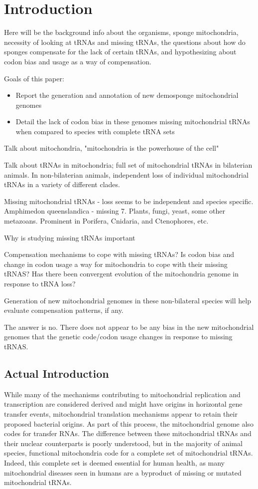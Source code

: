 \documentclass[../main.tex]{subfiles}
\begin{document}
\section{Introduction}
Here will be the background info about the organisms, sponge
mitochondria, necessity of looking at tRNAs and missing tRNAs, the questions about how do sponges compensate for the lack of certain tRNAs, and hypothesizing about codon bias and usage as a way of compensation.

Goals of this paper:
\begin{itemize}
    \item Report the generation and annotation of new demosponge mitochondrial genomes
    \item Detail the lack of codon bias in these genomes missing mitochondrial tRNAs when compared to species with complete tRNA sets
\end{itemize}

Talk about mitochondria, "mitochondria is the powerhouse of the cell"

Talk about tRNAs in mitochondria; full set of mitochondrial tRNAs in bilaterian animals. In non-bilaterian animals, independent loss of individual mitochondrial tRNAs in a variety of different clades.

Missing mitochondrial tRNAs - loss seems to be independent and species specific. Amphimedon queenslandica - missing 7. Plants, fungi, yeast, some other metazoans. Prominent in Porifera, Cnidaria, and Ctenophores, etc.

Why is studying missing tRNAs important

Compensation mechanisms to cope with missing tRNAs? Is codon bias and change in codon usage a way for mitochondria to cope with their missing tRNAS? Has there been convergent evolution of the mitochondria genome in response to tRNA loss? 

Generation of new mitochondrial genomes in these non-bilateral species will help evaluate compensation patterns, if any. 

The answer is no. There does not appear to be any bias in the new mitochondrial genomes that the genetic code/codon usage changes in response to missing tRNAS.

\subsection{Actual Introduction}

While many of the mechanisms contributing to mitochondrial replication and transcription are considered derived and might have origins in horizontal gene transfer events, mitochondrial translation mechanisms appear to retain their proposed bacterial origins. As part of this process, the mitochondrial genome also codes for transfer RNAs. The difference between these mitochondrial tRNAs and their nuclear counterparts is poorly understood, but in the majority of animal species, functional mitochondria code for a complete set of mitochondrial tRNAs. Indeed, this complete set is deemed essential for human health, as many mitochondrial diseases seen in humans are a byproduct of missing or mutated mitochondrial tRNAs. 
\end{document}
